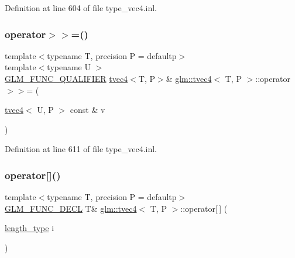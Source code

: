 Definition at line 604 of file type\+\_\+vec4.\+inl.

\mbox{\label{structglm_1_1tvec4_aafc6289fa58e4d84390259bf8287cb72}} 
\subsubsection{\texorpdfstring{operator$>$$>$=()}{operator>>=()}\hspace{0.1cm}{\footnotesize\ttfamily [6/6]}}
{\footnotesize\ttfamily template$<$typename T, precision P = defaultp$>$ \\
template$<$typename U $>$ \\
\mbox{\hyperlink{setup_8hpp_a33fdea6f91c5f834105f7415e2a64407}{G\+L\+M\+\_\+\+F\+U\+N\+C\+\_\+\+Q\+U\+A\+L\+I\+F\+I\+ER}} \mbox{\hyperlink{structglm_1_1tvec4}{tvec4}}$<$T, P$>$\& \mbox{\hyperlink{structglm_1_1tvec4}{glm\+::tvec4}}$<$ T, P $>$\+::operator$>$$>$= (\begin{DoxyParamCaption}\item[{\mbox{\hyperlink{structglm_1_1tvec4}{tvec4}}$<$ U, P $>$ const \&}]{v }\end{DoxyParamCaption})}



Definition at line 611 of file type\+\_\+vec4.\+inl.

\mbox{\label{structglm_1_1tvec4_a036a73844fb59380b1149744e1ddd2b2}} 
\subsubsection{\texorpdfstring{operator[]()}{operator[]()}\hspace{0.1cm}{\footnotesize\ttfamily [1/2]}}
{\footnotesize\ttfamily template$<$typename T, precision P = defaultp$>$ \\
\mbox{\hyperlink{setup_8hpp_ab2d052de21a70539923e9bcbf6e83a51}{G\+L\+M\+\_\+\+F\+U\+N\+C\+\_\+\+D\+E\+CL}} T\& \mbox{\hyperlink{structglm_1_1tvec4}{glm\+::tvec4}}$<$ T, P $>$\+::operator\mbox{[}$\,$\mbox{]} (\begin{DoxyParamCaption}\item[{\mbox{\hyperlink{structglm_1_1tvec4_a4e2b34a427cac7e72b6f73173c206feb}{length\+\_\+type}}}]{i }\end{DoxyParamCaption})}

